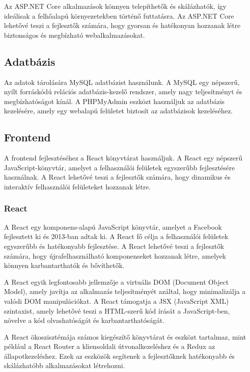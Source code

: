 \documentclass[colorlinks]{thesis-kando}
\theoremstyle{definition}
\theoremstyle{remark}
\begin{document}
Az ASP.NET Core alkalmazások könnyen telepíthetők és skálázhatók, így ideálisak a felhőalapú környezetekben történő futtatásra. Az ASP.NET Core lehetővé teszi a fejlesztők számára, hogy gyorsan és hatékonyan hozzanak létre biztonságos és megbízható webalkalmazásokat.

\subsection{Adatbázis}
Az adatok tárolására MySQL adatbázist használunk. A MySQL egy népszerű, nyílt forráskódú relációs adatbázis-kezelő rendszer, amely nagy teljesítményt és megbízhatóságot kínál. A PHPMyAdmin eszközt használjuk az adatbázis kezelésére, amely egy webalapú felületet biztosít az adatbázisok kezeléséhez.

\subsection{Frontend}
A frontend fejlesztéséhez a React könyvtárat használjuk. A React egy népszerű JavaScript-könyvtár, amelyet a felhasználói felületek egyszerűbb fejlesztésére használnak. A React lehetővé teszi a fejlesztők számára, hogy dinamikus és interaktív felhasználói felületeket hozzanak létre.

\subsubsection{React}
A React egy komponens-alapú JavaScript könyvtár, amelyet a Facebook fejlesztett ki és 2013-ban adtak ki. A React fő célja a felhasználói felületek egyszerűbb és hatékonyabb fejlesztése. A React lehetővé teszi a fejlesztők számára, hogy újrafelhasználható komponenseket hozzanak létre, amelyek könnyen karbantarthatók és bővíthetők.

A React egyik legfontosabb jellemzője a virtuális DOM (Document Object Model), amely javítja az alkalmazás teljesítményét azáltal, hogy minimalizálja a valódi DOM manipulációkat. A React támogatja a JSX (JavaScript XML) szintaxist, amely lehetővé teszi a HTML-szerű kód írását a JavaScript-ben, növelve a kód olvashatóságát és karbantarthatóságát.

A React ökoszisztémája számos kiegészítő könyvtárat és eszközt tartalmaz, mint például a React Router a kliensoldali útvonalkezeléshez és a Redux az állapotkezeléshez. Ezek az eszközök segítenek a fejlesztőknek hatékonyabb és skálázhatóbb alkalmazásokat létrehozni.
\end{document}
